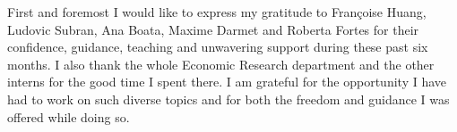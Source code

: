 First and foremost I would like to express my gratitude to Françoise Huang, Ludovic Subran, Ana Boata, Maxime Darmet and Roberta Fortes for their confidence, guidance, teaching and unwavering support during these past six months. 
I also thank the whole Economic Research department and the other interns for the good time I spent there. 
I am grateful for the opportunity I have had to work on such diverse topics and for both the freedom and guidance I was offered while doing so. 